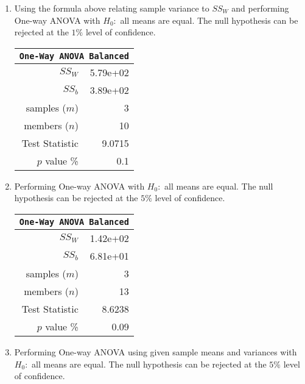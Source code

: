 \begin{enumerate}
	\item Using the formula above relating sample variance to $ SS_W $ and performing One-way ANOVA with $ H_0 : $ all means are equal. The null hypothesis can be rejected at the $ 1\% $ level of confidence.
	
	\begin{table}[H]
		\centering
		\begin{tabular}{@{}rr@{}}
			\toprule
			\multicolumn{2}{c}{\texttt{One-Way ANOVA Balanced}} \\
			\midrule
			$SS_W$         &               5.79e+02 \\
			$SS_b$         &               3.89e+02 \\
			samples ($m$)  &                      3 \\
			members ($n$)  &                     10 \\
			Test Statistic &                 9.0715 \\
			$p$ value \%   &                    0.1 \\
			\bottomrule
		\end{tabular}
		
		\bigskip
	\end{table}


	\item Performing One-way ANOVA with $ H_0 : $ all means are equal. The null hypothesis can be rejected at the $ 5\% $ level of confidence.
	
	\begin{table}[H]
		\centering
		\begin{tabular}{@{}rr@{}}
			\toprule
			\multicolumn{2}{c}{\texttt{One-Way ANOVA Balanced}} \\
			\midrule
			$SS_W$         &               1.42e+02 \\
			$SS_b$         &               6.81e+01 \\
			samples ($m$)  &                      3 \\
			members ($n$)  &                     13 \\
			Test Statistic &                 8.6238 \\
			$p$ value \%   &                   0.09 \\
			\bottomrule
		\end{tabular}
		
		\bigskip
	\end{table}

	\item Performing One-way ANOVA using given sample means and variances with $ H_0 : $ all means are equal. The null hypothesis can be rejected at the $ 5\% $ level of confidence.
	

\end{enumerate}
